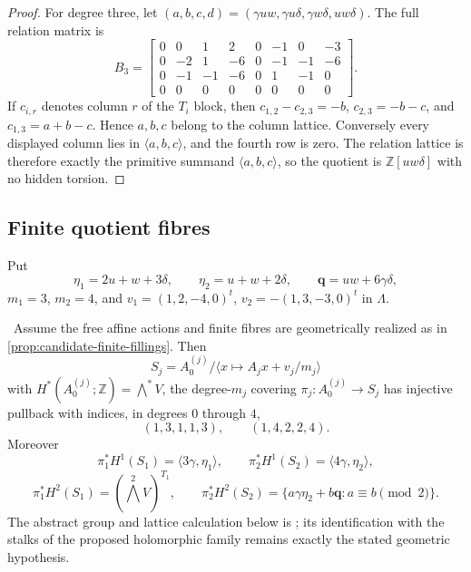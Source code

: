\begin{proof}
For degree three, let
$(a,b,c,d)=(\gamma uw,\gamma u\delta,\gamma w\delta,uw\delta)$.
The full relation matrix is
\[
B_3=
\left[
\begin{array}{rrrr|rrrr}
0&0&1&2&0&-1&0&-3\\
0&-2&1&-6&0&-1&-1&-6\\
0&-1&-1&-6&0&1&-1&0\\
0&0&0&0&0&0&0&0
\end{array}
\right].
\tag{3.6b}
\]
If $c_{i,r}$ denotes column $r$ of the $T_i$ block, then
$c_{1,2}-c_{2,3}=-b$, $c_{2,3}=-b-c$, and
$c_{1,3}=a+b-c$.  Hence $a,b,c$ belong to the column lattice.
Conversely every displayed column lies in $\langle a,b,c\rangle$, and the
fourth row is zero.  The relation lattice is therefore exactly the primitive
summand $\langle a,b,c\rangle$, so the quotient is
$\mathbb Z[uw\delta]$ with no hidden torsion.
\end{proof}

\subsection{Finite quotient fibres}

Put
\[
\eta_1=2u+w+3\delta,\qquad
\eta_2=u+w+2\delta,\qquad
\mathbf q=uw+6\gamma\delta,
\]
$m_1=3$, $m_2=4$, and
$v_1=(1,2,-4,0)^t$, $v_2=-(1,3,-3,0)^t$ in $\Lambda$.

\begin{proposition}
\label{prop:finite-indices}
\Conditional\ Assume the free affine actions and finite fibres are
geometrically realized as in \cref{prop:candidate-finite-fillings}.  Then
\[
S_j=A_0^{(j)}/\langle x\mapsto A_jx+v_j/m_j\rangle
\]
with $H^*(A_0^{(j)};\mathbb Z)=\bigwedge^*V$, the
degree-$m_j$ covering $\pi_j:A_0^{(j)}\to S_j$ has injective pullback with
indices, in degrees $0$ through $4$,
\[
(1,3,1,1,3),\qquad (1,4,2,2,4).
\tag{3.7}
\]
Moreover
\[
\pi_1^*H^1(S_1)=\langle3\gamma,\eta_1\rangle,\qquad
\pi_2^*H^1(S_2)=\langle4\gamma,\eta_2\rangle,
\]
\[
\pi_1^*H^2(S_1)=(\textstyle\bigwedge^2V)^{T_1},\qquad
\pi_2^*H^2(S_2)
=\{a\gamma\eta_2+b\mathbf q:a\equiv b\pmod2\}.
\tag{3.8}
\]
The abstract group and lattice calculation below is \Verified; its
identification with the stalks of the proposed holomorphic family remains
exactly the stated geometric hypothesis.
\end{proposition}

